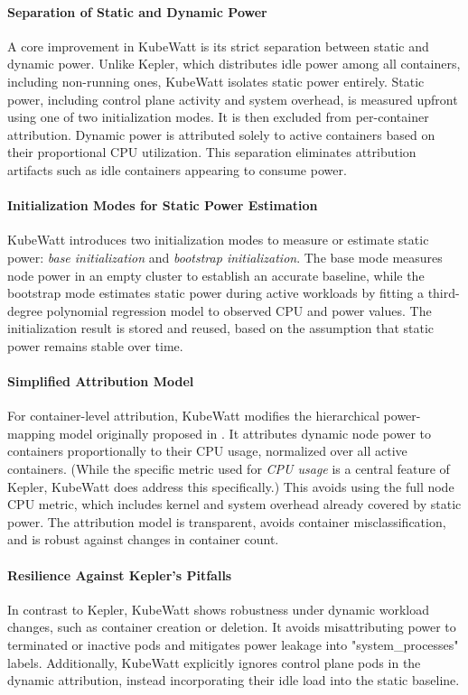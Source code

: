 \paragraph{Separation of Static and Dynamic Power}
A core improvement in KubeWatt is its strict separation between static and dynamic power. Unlike Kepler, which distributes idle power among all containers, including non-running ones, KubeWatt isolates static power entirely. Static power, including control plane activity and system overhead, is measured upfront using one of two initialization modes. It is then excluded from per-container attribution. Dynamic power is attributed solely to active containers based on their proportional CPU utilization. This separation eliminates attribution artifacts such as idle containers appearing to consume power.

\paragraph{Initialization Modes for Static Power Estimation}
KubeWatt introduces two initialization modes to measure or estimate static power: \textit{base initialization} and \textit{bootstrap initialization}. The base mode measures node power in an empty cluster to establish an accurate baseline, while the bootstrap mode estimates static power during active workloads by fitting a third-degree polynomial regression model to observed CPU and power values. The initialization result is stored and reused, based on the assumption that static power remains stable over time.

\paragraph{Simplified Attribution Model}
For container-level attribution, KubeWatt modifies the hierarchical power-mapping model originally proposed in \cite{andringa2024estimating}. It attributes dynamic node power to containers proportionally to their CPU usage, normalized over all active containers. (While the specific metric used for \emph{CPU usage} is a central feature of Kepler, KubeWatt does address this specifically.) This avoids using the full node CPU metric, which includes kernel and system overhead already covered by static power. The attribution model is transparent, avoids container misclassification, and is robust against changes in container count.

\paragraph{Resilience Against Kepler's Pitfalls}
In contrast to Kepler, KubeWatt shows robustness under dynamic workload changes, such as container creation or deletion. It avoids misattributing power to terminated or inactive pods and mitigates power leakage into "system\_processes" labels. Additionally, KubeWatt explicitly ignores control plane pods in the dynamic attribution, instead incorporating their idle load into the static baseline.

